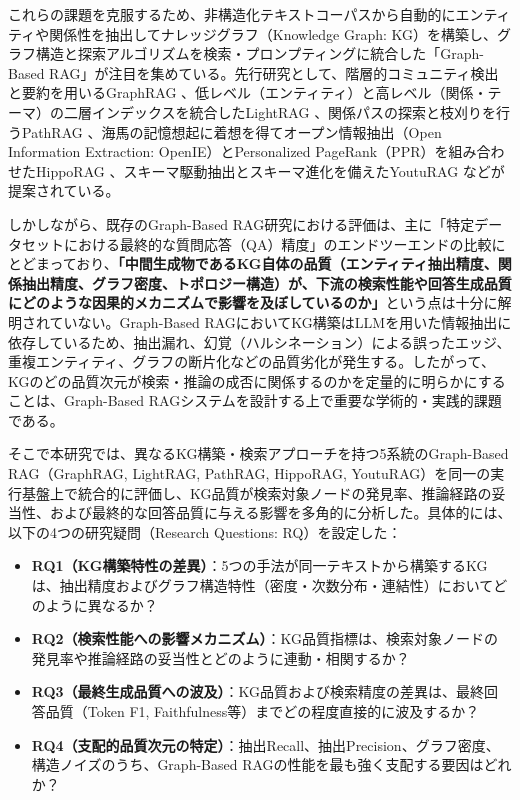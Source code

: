 \documentclass[a4j,dvipdfmx]{jsarticle}
\begin{document}
これらの課題を克服するため、非構造化テキストコーパスから自動的にエンティティや関係性を抽出してナレッジグラフ（Knowledge Graph: KG）を構築し、グラフ構造と探索アルゴリズムを検索・プロンプティングに統合した「Graph-Based RAG」が注目を集めている。先行研究として、階層的コミュニティ検出と要約を用いるGraphRAG \cite{edge2024graphrag}、低レベル（エンティティ）と高レベル（関係・テーマ）の二層インデックスを統合したLightRAG \cite{guo2024lightrag}、関係パスの探索と枝刈りを行うPathRAG \cite{chen2024pathrag}、海馬の記憶想起に着想を得てオープン情報抽出（Open Information Extraction: OpenIE）とPersonalized PageRank（PPR）を組み合わせたHippoRAG \cite{gutierrez2024hipporag}、スキーマ駆動抽出とスキーマ進化を備えたYoutuRAG \cite{dong2025youtu}などが提案されている\cite{pan2024unifying}。

しかしながら、既存のGraph-Based RAG研究における評価は、主に「特定データセットにおける最終的な質問応答（QA）精度」のエンドツーエンドの比較にとどまっており、\textbf{「中間生成物であるKG自体の品質（エンティティ抽出精度、関係抽出精度、グラフ密度、トポロジー構造）が、下流の検索性能や回答生成品質にどのような因果的メカニズムで影響を及ぼしているのか」}という点は十分に解明されていない。Graph-Based RAGにおいてKG構築はLLMを用いた情報抽出に依存しているため、抽出漏れ、幻覚（ハルシネーション）による誤ったエッジ、重複エンティティ、グラフの断片化などの品質劣化が発生する。したがって、KGのどの品質次元が検索・推論の成否に関係するのかを定量的に明らかにすることは、Graph-Based RAGシステムを設計する上で重要な学術的・実践的課題である。

そこで本研究では、異なるKG構築・検索アプローチを持つ5系統のGraph-Based RAG（GraphRAG, LightRAG, PathRAG, HippoRAG, YoutuRAG）を同一の実行基盤上で統合的に評価し、KG品質が検索対象ノードの発見率、推論経路の妥当性、および最終的な回答品質に与える影響を多角的に分析した。具体的には、以下の4つの研究疑問（Research Questions: RQ）を設定した：
\begin{itemize}
    \item \textbf{RQ1（KG構築特性の差異）}：5つの手法が同一テキストから構築するKGは、抽出精度およびグラフ構造特性（密度・次数分布・連結性）においてどのように異なるか？
    \item \textbf{RQ2（検索性能への影響メカニズム）}：KG品質指標は、検索対象ノードの発見率や推論経路の妥当性とどのように連動・相関するか？
    \item \textbf{RQ3（最終生成品質への波及）}：KG品質および検索精度の差異は、最終回答品質（Token F1, Faithfulness等）までどの程度直接的に波及するか？
    \item \textbf{RQ4（支配的品質次元の特定）}：抽出Recall、抽出Precision、グラフ密度、構造ノイズのうち、Graph-Based RAGの性能を最も強く支配する要因はどれか？
\end{itemize}
\end{document}
